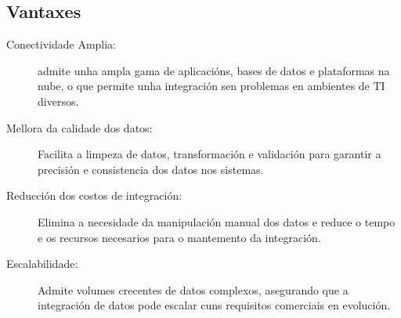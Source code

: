 \subsection{Vantaxes}

\begin{description}
    \item[Conectividade Amplia:] admite unha ampla gama de aplicacións, bases de datos e plataformas na nube, o que permite unha integración sen problemas en ambientes de TI diversos.
    
    \item[Mellora da calidade dos datos:] Facilita a limpeza de datos, transformación e validación para garantir a precisión e consistencia dos datos nos sistemas.
    
    \item[Reducción dos costos de integración:] Elimina a necesidade da manipulación manual dos datos e reduce o tempo e os recursos necesarios para o mantemento da integración.
    
    \item[Escalabilidade:] Admite volumes crecentes de datos complexos, asegurando que a integración de datos pode escalar cuns requisitos comerciais en evolución.
\end{description}
